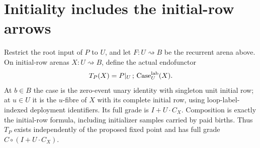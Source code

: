 \documentclass[11pt]{article}
\begin{document}
\section{Initiality includes the initial-row arrows}
Restrict the root input of $P$ to $U$, and let $F:U\rightsquigarrow B$ be the recurrent arena above. On initial-row arenas $X:U\rightsquigarrow B$, define the actual endofunctor
\[
 T_P(X)=P|_U\,;\,\operatorname{Case}^{\rm lab}_U(X).
\]
At $b\in B$ the case is the zero-event unary identity with singleton unit initial row; at $u\in U$ it is the $u$-fibre of $X$ with its complete initial row, using loop-label-indexed deployment identifiers. Its full grade is $I+U\cdot C_X$. Composition is exactly the initial-row formula, including initializer samples carried by paid births. Thus $T_P$ exists independently of the proposed fixed point and has full grade $C\circ(I+U\cdot C_X)$.
\end{document}

